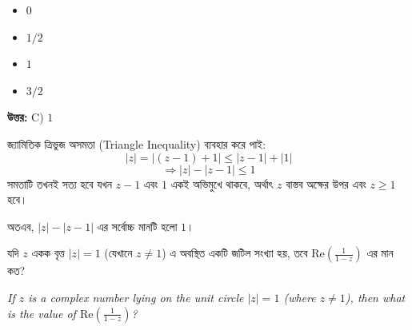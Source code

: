 \documentclass[12pt, a4paper]{article}
\begin{document}
\begin{itemize}[label={}, leftmargin=1cm, itemsep=0.5em]
    \item[\textbf{A)}] $0$
    \item[\textbf{B)}] $1/2$
    \item[\textbf{C)}] $1$
    \item[\textbf{D)}] $3/2$
\end{itemize}

\vspace{0.5em}
\begin{tcolorbox}[answerbox]
    \textbf{\color{success} উত্তর:} C) $1$
\end{tcolorbox}
\vspace{1em}

\begin{tcolorbox}[solutionbox={সমাধান (Solution)}]
    \noindent
    জ্যামিতিক ত্রিভুজ অসমতা (Triangle Inequality) ব্যবহার করে পাই:
    \[ |z| = |(z-1) + 1| \leq |z-1| + |1| \]
    \[ \Rightarrow |z| - |z-1| \leq 1 \]
    সমতাটি তখনই সত্য হবে যখন $z-1$ এবং $1$ একই অভিমুখে থাকবে, অর্থাৎ $z$ বাস্তব অক্ষের উপর এবং $z \geq 1$ হবে। 
    
    অতএব, $|z| - |z-1|$ এর সর্বোচ্চ মানটি হলো $1$।
\end{tcolorbox}

\vspace{1em}

\begin{tcolorbox}[questionbox={প্রশ্ন (Question) 12}]
    \noindent
    যদি $z$ একক বৃত্ত $|z| = 1$ (যেখানে $z \neq 1$) এ অবস্থিত একটি জটিল সংখ্যা হয়, তবে $\text{Re}\left(\frac{1}{1-z}\right)$ এর মান কত?
    
    \vspace{0.8em}
    \begin{english}
    \noindent\textit{\color{darkgray}
    If $z$ is a complex number lying on the unit circle $|z| = 1$ (where $z \neq 1$), then what is the value of $\text{Re}\left(\frac{1}{1-z}\right)$?
    }
    \end{english}
\end{tcolorbox}
\end{document}
